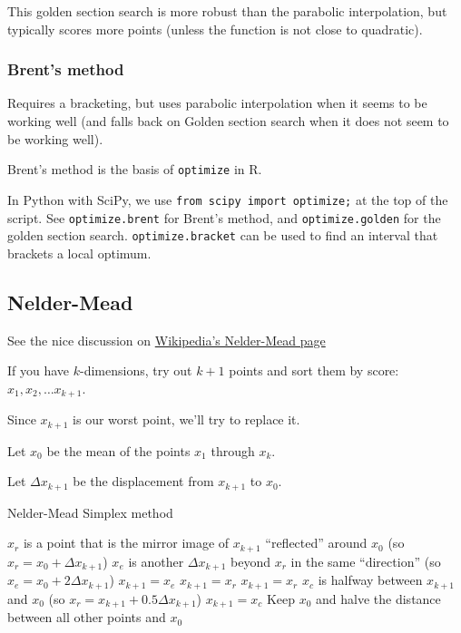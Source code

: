 \documentclass[11pt]{article}
\begin{document}
This golden section search is more robust than the parabolic interpolation, but typically scores more points (unless the function is not close to quadratic).
\subsubsection*{Brent's method}

Requires a bracketing, but uses parabolic interpolation when it seems to be working well (and falls back on Golden section search when it does not seem to be working well).

Brent's method is the basis of {\tt optimize} in R.

In Python with SciPy, we use {\tt from scipy import optimize;} at the top of the script. See {\tt optimize.brent} for Brent's method, and {\tt optimize.golden} for the golden section search. {\tt optimize.bracket} can be used to find an interval that brackets a local optimum.

\subsection{Nelder-Mead}
See the nice discussion on \href{http://en.wikipedia.org/wiki/Nelder%E2%80%93Mead_method}{Wikipedia's Nelder-Mead page}

If you have $k$-dimensions, try out $k+1$ points and sort them by score: $x_1, x_2, \ldots x_{k+1}$.

Since $x_{k+1}$ is our worst point, we'll try to replace it.

Let $x_0$ be the mean of the points $x_1$ through $x_k$.

Let $\Delta x_{k+1}$ be the displacement from $x_{k+1}$ to $x_0$.


\begin{algorithm} 
\caption{Nelder-Mead Simplex method}
\begin{algorithmic}[1]
	\STATE $x_r$ is a point that is the mirror image of $x_{k+1}$ ``reflected'' around $x_0$ (so $x_r = x_0 + \Delta x_{k+1}$)
	\STATE  $x_e$ is another  $\Delta x_{k+1}$ beyond $x_r$ in the same ``direction'' (so $x_e = x_0 + 2 \Delta x_{k+1}$)
			\STATE $x_{k+1} = x_e$
		\ELSE
			\STATE $x_{k+1} = x_r$
		\ENDIF
		\STATE $x_{k+1} = x_r$
	\ELSE
		\STATE $x_c$ is halfway between $x_{k+1}$ and $x_0$ (so $x_r = x_{k+1} + 0.5\Delta x_{k+1}$)
			\STATE $x_{k+1} = x_c$
		\ELSE 
			\STATE  Keep $x_0$ and halve the distance between all other points and $x_0$
		\ENDIF
	\ENDIF
\end{algorithmic}
\end{algorithm}
\end{document}
